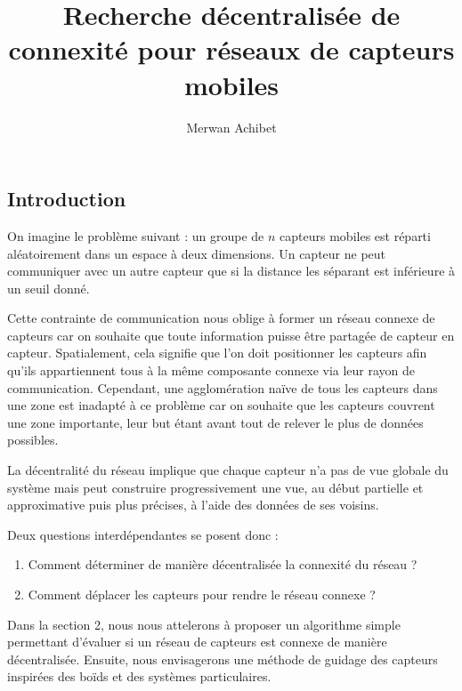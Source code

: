 \documentclass[10pt]{article}
\title{Recherche décentralisée de connexité pour réseaux de capteurs mobiles}
\author{Merwan Achibet}
\date{}
\begin{document}
\maketitle

\begin{multicols}{2}

\section{Introduction}

On imagine le problème suivant : un groupe de $n$ capteurs mobiles est
réparti aléatoirement dans un espace à deux dimensions. Un capteur ne
peut communiquer avec un autre capteur que si la distance les séparant
est inférieure à un seuil donné.

Cette contrainte de communication nous oblige à former un réseau
connexe de capteurs car on souhaite que toute information puisse être
partagée de capteur en capteur. Spatialement, cela signifie que l'on
doit positionner les capteurs afin qu'ils appartiennent tous à la même
composante connexe via leur rayon de communication. Cependant, une
agglomération naïve de tous les capteurs dans une zone est inadapté à
ce problème car on souhaite que les capteurs couvrent une zone
importante, leur but étant avant tout de relever le plus de données
possibles.

La décentralité du réseau implique que chaque capteur n'a pas de vue
globale du système mais peut construire progressivement une vue, au
début partielle et approximative puis plus précises, à l'aide des
données de ses voisins.

Deux questions interdépendantes se posent donc :

\begin{enumerate}
  \item{Comment déterminer de manière décentralisée la connexité du
    réseau ?}
  \item{Comment déplacer les capteurs pour rendre le réseau connexe ?}
\end{enumerate}

Dans la section 2, nous nous attelerons à proposer un algorithme
simple permettant d'évaluer si un réseau de capteurs est connexe de
manière décentralisée. Ensuite, nous envisagerons une méthode de
guidage des capteurs inspirées des boïds et des systèmes
particulaires.

\begin{figure}[H]

  \centering


\end{figure}
\end{multicols}
\end{document}
